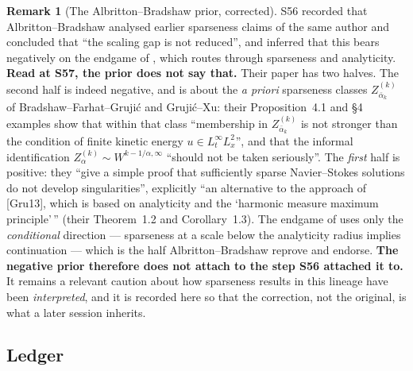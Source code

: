 \documentclass[11pt]{article}
\theoremstyle{definition}
\newtheorem{remark}[theorem]{Remark}
\theoremstyle{remark}
\begin{document}
\begin{remark}[The Albritton--Bradshaw prior, corrected]
  \label{rem:s57-ab}
  S56 recorded that Albritton--Bradshaw \cite{AlbrittonBradshaw2022} analysed
  earlier sparseness claims of the same author and concluded that ``the
  scaling gap is not reduced'', and inferred that this bears negatively on the
  endgame of \cite{Grujic2026Log}, which routes through sparseness and
  analyticity. \textbf{Read at S57, the prior does not say that.} Their paper
  has two halves. The second half is indeed negative, and is about the
  \emph{a priori} sparseness classes $Z^{(k)}_{\bar\alpha_k}$ of
  Bradshaw--Farhat--Gruji\'c and Gruji\'c--Xu: their Proposition~4.1 and
  \S4 examples show that within that class ``membership in
  $Z^{(k)}_{\bar\alpha_k}$ is not stronger than the condition of finite
  kinetic energy $u\in L^\infty_tL^2_x$'', and that the informal
  identification $Z^{(k)}_\alpha\sim W^{k-1/\alpha,\infty}$ ``should not be
  taken seriously''. The \emph{first} half is positive: they ``give a simple
  proof that sufficiently sparse Navier--Stokes solutions do not develop
  singularities'', explicitly ``an alternative to the approach of [Gru13],
  which is based on analyticity and the `harmonic measure maximum principle'\,''
  (their Theorem~1.2 and Corollary~1.3). The endgame of
  \cite[\S7]{Grujic2026Log} uses only the \emph{conditional} direction ---
  sparseness at a scale below the analyticity radius implies continuation ---
  which is the half Albritton--Bradshaw reprove and endorse. \textbf{The
  negative prior therefore does not attach to the step S56 attached it to.}
  It remains a relevant caution about how sparseness results in this lineage
  have been \emph{interpreted}, and it is recorded here so that the
  correction, not the original, is what a later session inherits.
\end{remark}

\subsection{Ledger}
\label{subsec:s57-ledger}
\end{document}
